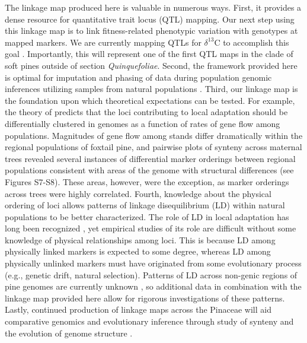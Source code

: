 \documentclass[smallextended]{svjour3}
\begin{document}
The linkage map produced here is valuable in numerous ways. First, it provides a
dense resource for quantitative trait locus (QTL) mapping. Our next step using
this linkage map is to link fitness-related phenotypic variation with genotypes
at mapped markers. We are currently mapping QTLs for $\delta^{13}$C to
accomplish this goal \citep[cf.,][]{Hausmann:2005}. Importantly, this will represent one of the first QTL maps
in the clade of soft pines outside of section \textit{Quinquefoliae}. Second,
the framework provided here is optimal for imputation and phasing of data during
population genomic inferences utilizing samples from natural populations
\citep{Scheet:2006}.  Third, our linkage map is the foundation upon which
theoretical expectations can be tested.  For example, the theory of
\citet{Yeaman:2011} predicts that the loci contributing to local adaptation
should be differentially clustered in genomes as a function of rates of gene
flow among populations. Magnitudes of gene flow among stands differ dramatically
within the regional populations of foxtail pine, and pairwise plots of synteny
across maternal trees revealed several instances of differential marker
orderings between regional populations consistent with areas of the genome with
structural differences (see Figures S7-S8). These areas, however, were the
exception, as marker orderings across trees were highly correlated.  Fourth,
knowledge about the physical ordering of loci allows patterns of linkage
disequilibrium (LD) within natural populations to be better characterized. The
role of LD in local adaptation has long been recognized
\citep[see][]{Akerman:2014}, yet empirical studies of its role are difficult
without some knowledge of physical relationships among loci. This is because LD
among physically linked markers is expected to some degree, whereas LD among
physically unlinked markers must have originated from some evolutionary process
(e.g., genetic drift, natural selection). Patterns of LD across non-genic regions of pine
genomes are currently unknown \citep[but see][]{Moritsuka:2012}, so additional data in combination with the linkage
map provided here allow for rigorous investigations of these patterns. 
Lastly, continued production of
linkage maps across the Pinaceae will aid comparative genomics and evolutionary
inference through study of synteny and the evolution of genome structure
\citep{Ritland:2011}.
\end{document}
